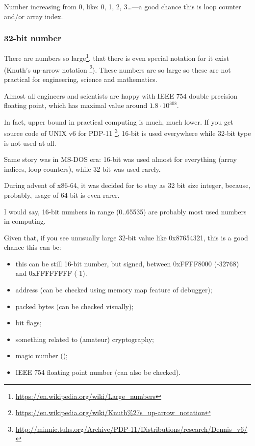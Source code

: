 Number increasing from 0, like: 0, 1, 2, 3\dots---a good chance this is loop counter and/or array index.

\subsubsection{32-bit number}

There are numbers so large\footnote{\url{https://en.wikipedia.org/wiki/Large_numbers}},
that there is even special notation for it exist (Knuth's up-arrow notation
\footnote{\url{https://en.wikipedia.org/wiki/Knuth\%27s_up-arrow_notation}}).
These numbers are so large so these are not practical for engineering, science and mathematics.

Almost all engineers and scientists are happy with IEEE 754 double precision floating point, which has maximal
value around $1.8 \cdot 10^{308}$.

In fact, upper bound in practical computing is much, much lower.
If you get source code of UNIX v6 for PDP-11
\footnote{\url{http://minnie.tuhs.org/Archive/PDP-11/Distributions/research/Dennis_v6/}},
16-bit  is used everywhere while 32-bit  type is not used at all.

Same story was in MS-DOS era: 16-bit  was used almost for everything (array indices, loop counters),
while 32-bit  was used rarely.

During advent of x86-64, it was decided for  to stay as 32 bit size integer, because, probably,
usage of 64-bit  is even rarer.

I would say, 16-bit numbers in range (0..65535) are probably most used numbers in computing.

Given that, if you see unusually large 32-bit value like 0x87654321, this is a good chance this can be:

\begin{itemize}

\item this can be still 16-bit number, but signed, between 0xFFFF8000 (-32768) and 0xFFFFFFFF (-1).
\item address (can be checked using memory map feature of debugger);
\item packed bytes (can be checked visually);
\item bit flags;
\item something related to (amateur) cryptography;
\item magic number ();
\item IEEE 754 floating point number (can also be checked).

\end{itemize}

